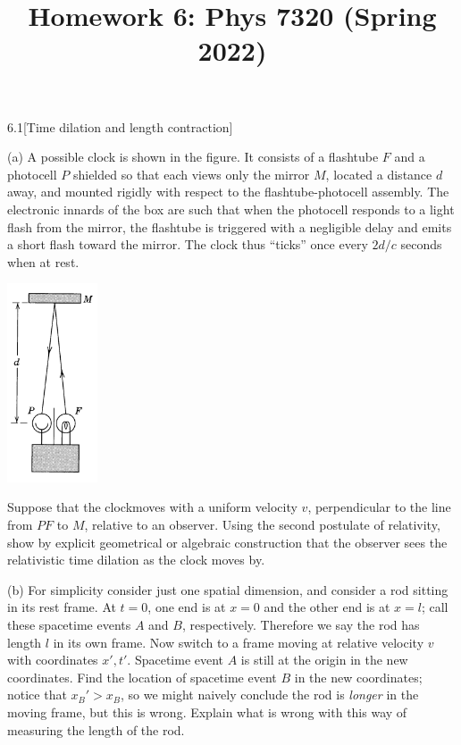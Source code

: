 \documentclass[12pt]{article}
\title{Homework 6: Phys 7320 (Spring 2022)}
\begin{document}
\maketitle
\begin{problem}{6.1}[Time dilation and length contraction]

(a) A possible clock is shown in the figure. It consists of a flashtube $F$ and
a photocell $P$ shielded so that each views only the mirror $M$, located a
distance $d$ away, and mounted rigidly with respect to the flashtube-photocell
assembly. The electronic innards of the box are such that when the photocell
responds to a light flash from the mirror, the flashtube is triggered with a
negligible delay and emits a short flash toward the mirror. The clock thus
``ticks'' once every $2d/c$ seconds when at rest.
\begin{center}
    \includegraphics[width=0.2\textwidth]{p1.png} 
\end{center}
Suppose that the clockmoves with a uniform velocity $v$, perpendicular to the
line from $PF$ to $M$, relative to an observer. Using the second postulate of
relativity, show by explicit geometrical or algebraic construction that the
observer sees the relativistic time dilation as the clock moves by.

(b) For simplicity consider just one spatial dimension, and consider a rod
sitting in its rest frame. At $t=0$, one end is at $x=0$ and the other end is at
$x=l$; call these spacetime events $A$ and $B$, respectively. Therefore we say
the rod has length $l$ in its own frame. Now switch to a frame moving at
relative velocity $v$ with coordinates $x',t'$. Spacetime event $A$ is still at
the origin in the new coordinates. Find the location of spacetime event $B$ in
the new coordinates; notice that $x_B'>x_B$, so we might naively conclude the
rod is \textit{longer} in the moving frame, but this is wrong. Explain what is
wrong with this way of measuring the length of the rod.


\end{problem}
\end{document}
